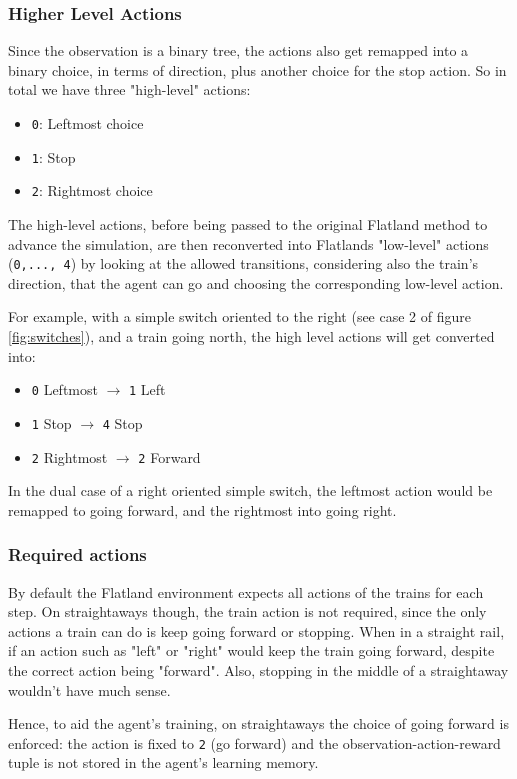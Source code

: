 \documentclass[13pt]{article}
\begin{document}
\subsubsection{Higher Level Actions}
Since the observation is a binary tree, the actions also get remapped into a binary choice, in terms of direction, plus another choice for the stop action. So in total we have three "high-level" actions:
\begin{itemize}
    \item \texttt{0}: Leftmost choice
    \item \texttt{1}: Stop
    \item \texttt{2}: Rightmost choice
\end{itemize}

The high-level actions, before being passed to the original Flatland method to advance the simulation, are then reconverted into Flatlands "low-level" actions (\texttt{0,..., 4}) by looking at the allowed transitions, considering also the train's direction, that the agent can go and choosing the corresponding low-level action.

For example, with a simple switch oriented to the right (see case 2 of figure \ref{fig:switches}), and a train going north, the high level actions will get converted into:
\begin{itemize}
    \item[] \texttt{0} Leftmost $\to$ \texttt{1} Left
    \item[] \texttt{1} Stop $\to$ \texttt{4} Stop
    \item[] \texttt{2} Rightmost $\to$ \texttt{2} Forward
\end{itemize}
In the dual case of a right oriented simple switch, the leftmost action would be remapped to going forward, and the rightmost into going right.

\subsubsection{Required actions}
By default the Flatland environment expects all actions of the trains for each step. On straightaways though, the train action is not required, since the only actions a train can do is keep going forward or stopping. When in a straight rail, if an action such as "left" or "right" would keep the train going forward, despite the correct action being "forward". Also, stopping in the middle of a straightaway wouldn't have much sense.

Hence, to aid the agent's  training, on straightaways the choice of going forward is enforced: the action is fixed to \texttt{2} (go forward) and the observation-action-reward tuple is not stored in the agent's learning memory.
\end{document}
